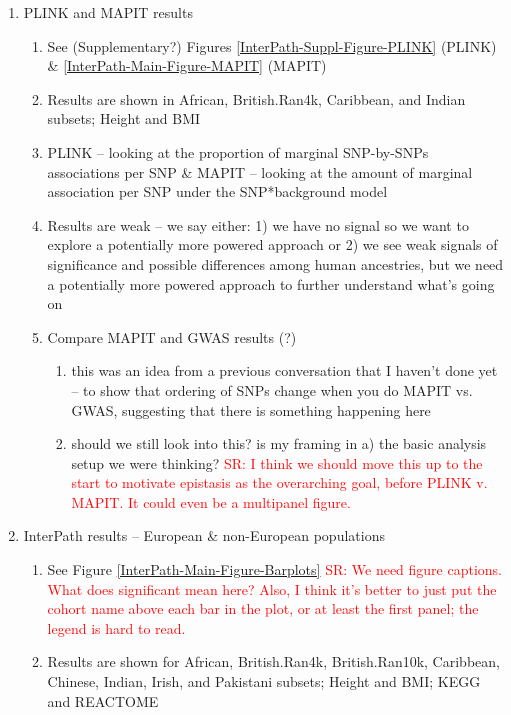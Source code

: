 \documentclass[12pt, a4paper]{article}
\newcommand{\red}[1]{\textcolor{red}{#1}}
\begin{document}
\begin{enumerate}
    \item PLINK and MAPIT results
    \begin{enumerate}
        \item See (Supplementary?) Figures \ref{InterPath-Suppl-Figure-PLINK} (PLINK) \& \ref{InterPath-Main-Figure-MAPIT} (MAPIT)
        \item Results are shown in African, British.Ran4k, Caribbean, and Indian subsets; Height and BMI
        \item PLINK -- looking at the proportion of marginal SNP-by-SNPs associations per SNP \& MAPIT -- looking at the amount of marginal association per SNP under the SNP*background model
        \item Results are weak -- we say either: 1) we have no signal so we want to explore a potentially more powered approach or 2) we see weak signals of significance and possible differences among human ancestries, but we need a potentially more powered approach to further understand what's going on
        \item Compare MAPIT and GWAS results (?)
        \begin{enumerate}
            \item this was an idea from a previous conversation that I haven't done yet -- to show that ordering of SNPs change when you do MAPIT vs. GWAS, suggesting that there is something happening here
            \item should we still look into this? is my framing in a) the basic analysis setup we were thinking? \red{SR: I think we should move this up to the start to motivate epistasis as the overarching goal, before PLINK v. MAPIT. It could even be a multipanel figure.}
        \end{enumerate}
    \end{enumerate}
    \item InterPath results -- European \& non-European populations
    \begin{enumerate}
        \item See Figure \ref{InterPath-Main-Figure-Barplots} \red{SR: We need figure captions. What does significant mean here? Also, I think it's better to just put the cohort name above each bar in the plot, or at least the first panel; the legend is hard to read.}
        \item Results are shown for African, British.Ran4k, British.Ran10k, Caribbean, Chinese, Indian, Irish, and Pakistani subsets; Height and BMI; KEGG and REACTOME

\end{enumerate}
\end{enumerate}
\end{document}
